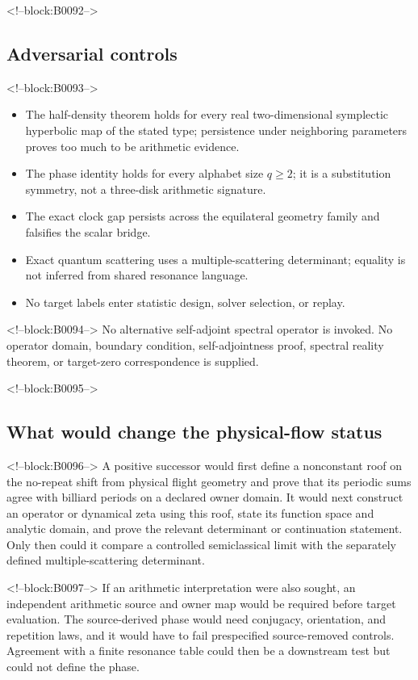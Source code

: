 \documentclass[11pt,a4paper]{article}
\theoremstyle{definition}
\theoremstyle{remark}
\begin{document}
<!--block:B0092-->
\subsection{Adversarial controls}

<!--block:B0093-->
\begin{itemize}
 \item The half-density theorem holds for every real two-dimensional symplectic hyperbolic map of the stated type; persistence under neighboring parameters proves too much to be arithmetic evidence.
 \item The phase identity holds for every alphabet size \(q\ge2\); it is a substitution symmetry, not a three-disk arithmetic signature.
 \item The exact clock gap persists across the equilateral geometry family and falsifies the scalar bridge.
 \item Exact quantum scattering uses a multiple-scattering determinant; equality is not inferred from shared resonance language.
 \item No target labels enter statistic design, solver selection, or replay.
\end{itemize}

<!--block:B0094-->
No alternative self-adjoint spectral operator is invoked. No operator domain, boundary condition, self-adjointness proof, spectral reality theorem, or target-zero correspondence is supplied.

<!--block:B0095-->
\subsection{What would change the physical-flow status}

<!--block:B0096-->
A positive successor would first define a nonconstant roof on the no-repeat shift from physical flight geometry and prove that its periodic sums agree with billiard periods on a declared owner domain. It would next construct an operator or dynamical zeta using this roof, state its function space and analytic domain, and prove the relevant determinant or continuation statement. Only then could it compare a controlled semiclassical limit with the separately defined multiple-scattering determinant.

<!--block:B0097-->
If an arithmetic interpretation were also sought, an independent arithmetic source and owner map would be required before target evaluation. The source-derived phase would need conjugacy, orientation, and repetition laws, and it would have to fail prespecified source-removed controls. Agreement with a finite resonance table could then be a downstream test but could not define the phase.
\end{document}
